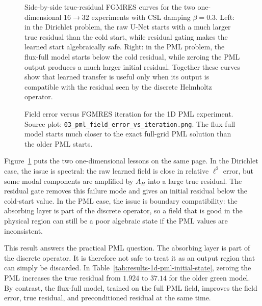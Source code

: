 \begin{figure}[htbp]
    \centering
    \caption{Side-by-side true-residual FGMRES curves for the two
    one-dimensional $16\to32$ experiments with CSL damping $\beta=0.3$.
    Left: in the Dirichlet problem, the raw U-Net starts with a much larger
    true residual than the cold start, while residual gating makes the learned
    start algebraically safe. Right: in the PML problem, the flux-full model
    starts below the cold residual, while zeroing the PML output produces a
    much larger initial residual. Together these curves show that learned
    transfer is useful only when its output is compatible with the residual
    seen by the discrete Helmholtz operator.}
    \label{fig:results-1d-dirichlet-pml-combined}
\end{figure}

\begin{figure}[htbp]
    \centering
    \caption{Field error versus FGMRES iteration for the 1D PML experiment.
    Source plot:
    \texttt{03\_pml\_field\_error\_vs\_iteration.png}.
    The flux-full model starts much closer to the exact full-grid PML solution
    than the older PML starts.}
    \label{fig:results-1d-pml-field-error}
\end{figure}

Figure~\ref{fig:results-1d-dirichlet-pml-combined} puts the two
one-dimensional lessons on the same page. In the Dirichlet case, the issue is
spectral: the raw learned field is close in relative $\ell^2$ error, but some
modal components are amplified by $A_H$ into a large true residual. The
residual gate removes this failure mode and gives an initial residual below
the cold-start value. In the PML case, the issue is boundary compatibility:
the absorbing layer is part of the discrete operator, so a field that is good
in the physical region can still be a poor algebraic state if the PML values
are inconsistent.

This result answers the practical PML question. The absorbing layer is part of
the discrete operator. It is therefore not safe to treat it as an output region
that can simply be discarded. In Table~\ref{tab:results-1d-pml-initial-state},
zeroing the PML increases the true residual from $1.924$ to $37.14$ for the
older green model. By contrast, the flux-full model, trained on the full PML
field, improves the field error, true residual, and preconditioned residual at
the same time.

